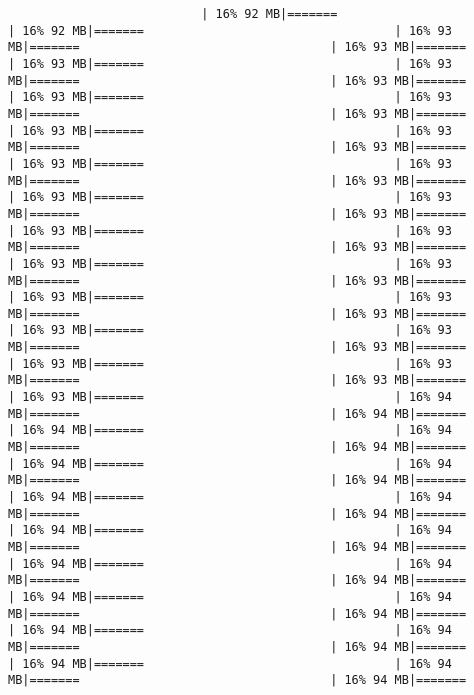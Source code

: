 \documentclass[
]{article}
\begin{document}
\begin{verbatim}
                           | 16% 92 MB|=======                                   | 16% 92 MB|=======                                   | 16% 93 MB|=======                                   | 16% 93 MB|=======                                   | 16% 93 MB|=======                                   | 16% 93 MB|=======                                   | 16% 93 MB|=======                                   | 16% 93 MB|=======                                   | 16% 93 MB|=======                                   | 16% 93 MB|=======                                   | 16% 93 MB|=======                                   | 16% 93 MB|=======                                   | 16% 93 MB|=======                                   | 16% 93 MB|=======                                   | 16% 93 MB|=======                                   | 16% 93 MB|=======                                   | 16% 93 MB|=======                                   | 16% 93 MB|=======                                   | 16% 93 MB|=======                                   | 16% 93 MB|=======                                   | 16% 93 MB|=======                                   | 16% 93 MB|=======                                   | 16% 93 MB|=======                                   | 16% 93 MB|=======                                   | 16% 93 MB|=======                                   | 16% 93 MB|=======                                   | 16% 93 MB|=======                                   | 16% 93 MB|=======                                   | 16% 93 MB|=======                                   | 16% 93 MB|=======                                   | 16% 93 MB|=======                                   | 16% 93 MB|=======                                   | 16% 93 MB|=======                                   | 16% 93 MB|=======                                   | 16% 93 MB|=======                                   | 16% 94 MB|=======                                   | 16% 94 MB|=======                                   | 16% 94 MB|=======                                   | 16% 94 MB|=======                                   | 16% 94 MB|=======                                   | 16% 94 MB|=======                                   | 16% 94 MB|=======                                   | 16% 94 MB|=======                                   | 16% 94 MB|=======                                   | 16% 94 MB|=======                                   | 16% 94 MB|=======                                   | 16% 94 MB|=======                                   | 16% 94 MB|=======                                   | 16% 94 MB|=======                                   | 16% 94 MB|=======                                   | 16% 94 MB|=======                                   | 16% 94 MB|=======                                   | 16% 94 MB|=======                                   | 16% 94 MB|=======                                   | 16% 94 MB|=======                                   | 16% 94 MB|=======                                   | 16% 94 MB|=======                                   | 16% 94 MB|=======                                   | 16% 94 MB|=======                                   | 16% 94 MB|=======                                   | 16% 94 MB|=======                                 
\end{verbatim}
\end{document}
